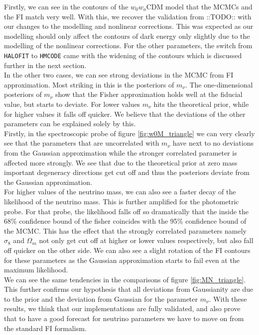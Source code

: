 \documentclass[oneside]{book}
\newcommand*{\marktodo}{{\color{mmcol} ::TODO::}\xspace}
\newcommand*{\halofit}{\texttt{HALOFIT}\xspace}
\newcommand*{\hmcode}{\texttt{HMCODE}\xspace}
\begin{document}
Firstly, we can see in the contours of the $w_0w_a$CDM model that the MCMCs and the FI match very well. With this, we recover the validation from \marktodo with our changes to the modelling and nonlinear corrections. This was expected as our modelling should only affect the contours of dark energy only slightly due to the modelling of the nonlinear corrections. For the other parameters, the switch from \halofit to \hmcode came with the widening of the contours which is discussed further in the next section.\\
In the other two cases, we can see strong deviations in the MCMC from FI approximation. Most striking in this is the posteriors of $m_\nu$.  The one-dimensional posteriors of $m_\nu$ show that the Fisher approximation holds well at the fiducial value, but starts to deviate. For lower values $m_\nu$ hits the theoretical prior, while for higher values it falls off quicker. We believe that the deviations of the other parameters can be explained solely by this.\\
Firstly, in the spectroscopic probe of figure \ref{fig:w0M_triangle} we can very clearly see that the parameters that are uncorrelated with $m_\nu$ have next to no deviations from the Gaussian approximation while the stronger correlated parameter is affected more strongly. We see that due to the theoretical prior at zero mass important degeneracy directions get cut off and thus the posteriors deviate from the Gaussian approximation.\\
For higher values of the neutrino mass, we can also see a faster decay of the likelihood of the neutrino mass. This is further amplified for the photometric probe. For that probe, the likelihood falls off so dramatically that the inside the 68\% confidence bound of the fisher coincides with the 95\% confidence bound of the MCMC. This has the effect that the strongly correlated parameters namely $\sigma_8$ and $\Omega_m$ not only get cut off at higher or lower values respectively, but also fall off quicker on the other side. We can also see a slight rotation of the FI contours for these parameters as the Gaussian approximation starts to fail even at the maximum likelihood.\\
We can see the same tendencies in the comparisons of figure \ref{fig:MN_triangle}. This further confirms our hypothesis that all deviations from Gaussianity are due to the prior and the deviation from Gaussian for the parameter $m_\nu$. With these results, we think that our implementations are fully validated, and also prove that to have a good forecast for neutrino parameters we have to move on from the standard FI formalism. 
\end{document}
